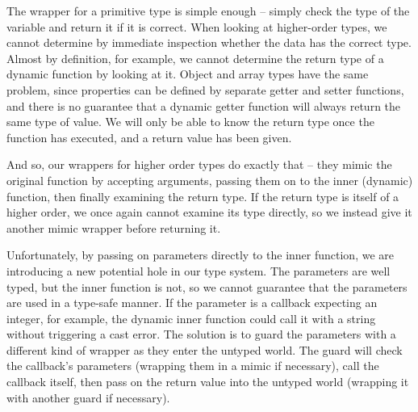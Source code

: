 \documentclass[12pt,a4paper,twoside,openright]{report}
\theoremstyle{definition}
\theoremstyle{dotless}
\begin{document}
The wrapper for a primitive type is simple enough -- simply check the type of
the variable and return it if it is correct. When looking at higher-order
types, we cannot determine by immediate inspection whether the data has the
correct type. Almost by definition, for example, we cannot determine the return
type of a dynamic function by looking at it. Object and array types have the
same problem, since properties can be defined by separate getter and setter
functions, and there is no guarantee that a dynamic getter function will always
return the same type of value. We will only be able to know the return type
once the function has executed, and a return value has been given.

And so, our wrappers for higher order types do exactly that -- they mimic the
original function by accepting arguments, passing them on to the inner
(dynamic) function, then finally examining the return type. If the return type
is itself of a higher order, we once again cannot examine its type directly, so
we instead give it another mimic wrapper before returning it. 

Unfortunately, by passing on parameters directly to the inner function, we are
introducing a new potential hole in our type system. The parameters are well
typed, but the inner function is not, so we cannot guarantee that the
parameters are used in a type-safe manner. If the parameter is a callback
expecting an integer, for example, the dynamic inner function could call it with a
string without triggering a cast error. The solution is to guard the parameters
with a different kind of wrapper as they enter the untyped world. The guard
will check the callback's parameters (wrapping them in a mimic if necessary),
call the callback itself, then pass on the return value into the untyped world
(wrapping it with another guard if necessary). 
\end{document}
